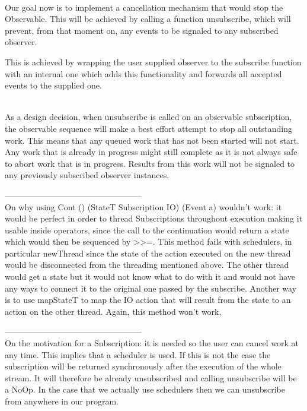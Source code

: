 \\

Our goal now is to implement a cancellation mechanism that would stop the Observable. This will be achieved by calling a function unsubscribe, which will prevent, from that moment on, any events to be signaled to any subscribed observer.

This is achieved by wrapping the user supplied observer to the subscribe function with an internal one which adds this functionality and forwards all accepted events to the supplied one.

\\

As a design decision, when unsubscribe is called on an observable subscription, the observable sequence will make a best effort attempt to stop all outstanding work. This means that any queued work that has not been started will not start. Any work that is already in progress might still complete as it is not always safe to abort work that is in progress. Results from this work will not be signaled to any previously subscribed observer instances.



--------------------------------------------------\\
On why using Cont () (StateT Subscription IO) (Event a) wouldn't work: it would be perfect in order to thread Subscriptions throughout execution making it usable inside operators, since the call to the continuation would return a state which would then be sequenced by >>=. This method fails with schedulers, in particular newThread since the state of the action executed on the new thread would be disconnected from the threading mentioned above. The other thread would get a state but it would not know what to do with it and would not have any ways to connect it to the original one passed by the subscribe. Another way is to use mapStateT to map the IO action that will result from the state to an action on the other thread. Again, this method won't work, 

--------------------------------------------------\\
On the motivation for a Subscription: it is needed so the user can cancel work at any time. This implies that a scheduler is used. If this is not the case the subscription will be returned synchronously after the execution of the whole stream. It will therefore be already unsubscribed and calling unsubscribe will be a NoOp. In the case that we actually use schedulers then we can unsubscribe from anywhere in our program. 

